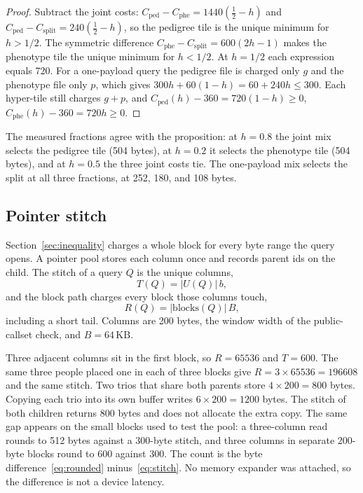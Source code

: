 \documentclass[11pt]{article}
\begin{document}
\begin{proof}
Subtract the joint costs:
\(C_{\mathrm{ped}} - C_{\mathrm{phe}} = 1440(\tfrac12 - h)\) and
\(C_{\mathrm{ped}} - C_{\mathrm{split}} = 240(\tfrac12 - h)\),
so the pedigree tile is the unique minimum for \(h > 1/2\).
The symmetric difference \(C_{\mathrm{phe}} - C_{\mathrm{split}} = 600(2h - 1)\) makes the phenotype tile the unique minimum for \(h < 1/2\).
At \(h = 1/2\) each expression equals 720.
For a one-payload query the pedigree file is charged only \(g\) and the phenotype file only \(p\), which gives \(300h + 60(1-h) = 60 + 240h \le 300\).
Each hyper-tile still charges \(g+p\), and
\(C_{\mathrm{ped}}(h) - 360 = 720(1-h) \ge 0\),
\(C_{\mathrm{phe}}(h) - 360 = 720h \ge 0\).
\end{proof}

The measured fractions agree with the proposition: at \(h = 0.8\) the joint mix selects the pedigree tile (504 bytes), at \(h = 0.2\) it selects the phenotype tile (504 bytes), and at \(h = 0.5\) the three joint costs tie.
The one-payload mix selects the split at all three fractions, at 252, 180, and 108 bytes.

\subsection{Pointer stitch}
\label{sec:pointers}

Section~\ref{sec:inequality} charges a whole block for every byte range the query opens.
A pointer pool stores each column once and records parent ids on the child.
The stitch of a query \(Q\) is the unique columns,
\begin{equation}
T(Q) = |U(Q)| \, b,
\label{eq:stitch}
\end{equation}
and the block path charges every block those columns touch,
\begin{equation}
R(Q) = |\mathrm{blocks}(Q)| \, B,
\label{eq:rounded}
\end{equation}
including a short tail.
Columns are 200 bytes, the window width of the public-callset check, and \(B = 64\,\mathrm{KB}\).

Three adjacent columns sit in the first block, so \(R = 65536\) and \(T = 600\).
The same three people placed one in each of three blocks give \(R = 3 \times 65536 = 196608\) and the same stitch.
Two trios that share both parents store \(4 \times 200 = 800\) bytes.
Copying each trio into its own buffer writes \(6 \times 200 = 1200\) bytes.
The stitch of both children returns 800 bytes and does not allocate the extra copy.
The same gap appears on the small blocks used to test the pool: a three-column read rounds to 512 bytes against a 300-byte stitch, and three columns in separate 200-byte blocks round to 600 against 300.
The count is the byte difference~\eqref{eq:rounded} minus~\eqref{eq:stitch}.
No memory expander was attached, so the difference is not a device latency.
\end{document}
